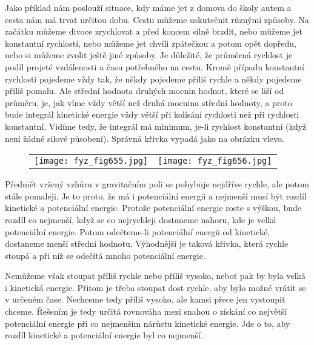     Jako příklad nám poslouží situace, kdy máme jet z domova do školy autem a cesta nám má trvat
    určitou dobu. Cestu můžeme uskutečnit různými způsoby. Na začátku můžeme divoce zrychlovat a
    před koncem silně brzdit, nebo můžeme jet konstantní rychlostí, nebo můžeme jet chvíli zpátečkou
    a potom opět dopředu, nebo si můžeme zvolit ještě jiné způsoby. Je důležité, že průměrná
    rychlost je podíl projeté vzdálenosti a času potřebného na cestu. Kromě případu konstantní
    rychlosti pojedeme vždy tak, že někdy pojedeme příliš rychle a někdy pojedeme příliš pomalu. Ale
    střední hodnota druhých mocnin hodnot, které se liší od průměru, je, jak víme vždy větší než
    druhá mocnina střední hodnoty, a proto bude integrál kinetické energie vždy větší při kolísání
    rychlosti než při rychlosti konstantní. Vidíme tedy, že integrál má minimum, je-li rychlost
    konstantní (když není žádné silové působení). Správná křivka vypadá jako na obrázku vlevo.
    
    \begin{figure}[ht!]  
      \centering
      \begin{tabular}{cc}
        \texttt{[image: fyz\_fig655.jpg]}             &                                                        
        \texttt{[image: fyz\_fig656.jpg]}
      \end{tabular}
    \end{figure}

    Předmět vržený vzhůru v gravitačním poli se pohybuje nejdříve rychle, ale potom stále pomaleji.
    Je to proto, že má i potenciální energii a nejmenší musí být rozdíl kinetické a potenciální
    energie. Protože potenciální energie roste s výškou, bude rozdíl co nejmenší, když se co
    nejrychleji dostaneme nahoru, kde je velká potenciální energie. Potom odečteme-li potenciální
    energii od kinetické, dostaneme menší střední hodnotu. Výhodnější je taková křivka, která rychle
    stoupá a při níž se odečítá mnoho potenciální energie.

    Nemůžeme však stoupat příliš rychle nebo příliš vysoko, neboť pak by byla velká i kinetická
    energie. Přitom je třeba stoupat dost rychle, aby bylo možné vrátit se v určeném čase. Nechceme
    tedy příliš vysoko, ale kamsi přece jen vystoupit chceme. Řešením je tedy určitá rovnováha mezi
    snahou o získání co největší potenciální energie při co nejmenším nárůstu kinetické energie. Jde
    o to, aby rozdíl kinetické a potenciální energie byl co nejmenší.

